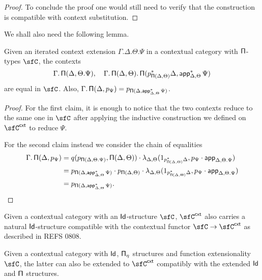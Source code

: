 \begin{proof}
  To conclude the proof one would still need to verify that the construction is
  compatible with context substitution.
\end{proof}


We shall also need the following lemma.

\begin{lem}\label{piequal}
  Given an iterated context extension $\Gamma.\Delta.\Theta.\Psi$ in a
  contextual category with $\operatorname{\mathsf{\Pi}}$-types $\sfC$, the contexts
  \[\Gamma.\operatorname{\mathsf{\Pi}}(\Delta,\Theta.\Psi),\quad\Gamma.\operatorname{\mathsf{\Pi}}(\Delta,\Theta).\operatorname{\mathsf{\Pi}}(p^*_{\operatorname{\mathsf{\Pi}}(\Delta,\Theta)}\Delta,\operatorname{\mathsf{app}}^*_{\Delta,\Theta}\Psi)\]
  are equal in $\sfC$. Also,
  $\Gamma.\operatorname{\mathsf{\Pi}}(\Delta,p_{\Psi})=p_{\operatorname{\mathsf{\Pi}}(\Delta,\operatorname{\mathsf{app}}^*_{\Delta,\Theta}\Psi)}$.
\end{lem}
\begin{proof}
  For the first claim, it is enough to notice that the two contexts reduce to
  the same one in $\sfC$ after applying the inductive construction we defined on
  $\sfC^{\cxt}$ to reduce $\Psi$.

  For the second claim instead we consider the chain of equalities
  \begin{align*}
    \Gamma.\operatorname{\mathsf{\Pi}}(\Delta,p_{\Psi})
    &=q(p_{\operatorname{\mathsf{\Pi}}(\Delta,\Theta.\Psi)},\operatorname{\mathsf{\Pi}}(\Delta,\Theta))\cdot
    \lambda_{\Delta,\Theta}(1_{p^*_{\operatorname{\mathsf{\Pi}}(\Delta,\Theta)}\Delta},p_\Psi\cdot\operatorname{\mathsf{app}}_{\Delta,\Theta.\Psi}) \\
    &=p_{\operatorname{\mathsf{\Pi}}(\Delta,\operatorname{\mathsf{app}}^*_{\Delta,\Theta}\Psi)}\cdot
    p_{\operatorname{\mathsf{\Pi}}(\Delta,\Theta)}\cdot
    \lambda_{\Delta,\Theta}(1_{p^*_{\operatorname{\mathsf{\Pi}}(\Delta,\Theta)}\Delta},p_\Psi\cdot\operatorname{\mathsf{app}}_{\Delta,\Theta.\Psi}) \\
    &=p_{\operatorname{\mathsf{\Pi}}(\Delta,\operatorname{\mathsf{app}}^*_{\Delta,\Theta}\Psi)}.
  \end{align*}
\end{proof}


\begin{prop}\cite[Prop.\ 3.3.1]{Gar09b}
  Given a contextual category with an $\operatorname{\mathsf{Id}}$-structure $\sfC$, $\sfC^{\cxt}$ also
  carries a natural $\operatorname{\mathsf{Id}}$-structure compatible with the contextual functor
  $\sfC\rightarrow\sfC^{\cxt}$ as described in REFS 0808.
\end{prop}

\begin{lem}\cite[Lemma 2.28]{1808}
  Given a contextual category with $\operatorname{\mathsf{Id}}$, $\operatorname{\mathsf{\Pi}_\eta}$ structures and function
  extensionality $\sfC$, the latter can also be extended to $\sfC^{\cxt}$
  compatibly with the extended $\operatorname{\mathsf{Id}}$ and $\operatorname{\mathsf{\Pi}}$ structures.
\end{lem}


